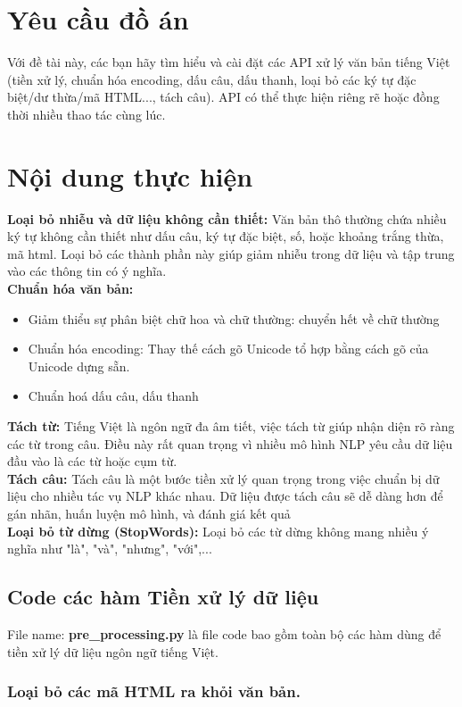
\section{Yêu cầu đồ án}
Với đề tài này, các bạn hãy tìm hiểu và cài đặt các API xử lý văn bản tiếng Việt (tiền xử lý, chuẩn hóa encoding, dấu câu, dấu thanh, loại bỏ các ký tự đặc biệt/dư thừa/mã HTML..., tách câu). API có thể thực hiện riêng rẽ hoặc đồng thời nhiều thao tác cùng lúc.

\section{Nội dung thực hiện}
{\bf Loại bỏ nhiễu và dữ liệu không cần thiết:} Văn bản thô thường chứa nhiều ký tự không cần thiết như dấu câu, ký tự đặc biệt, số, hoặc khoảng trắng thừa, mã html. Loại bỏ các thành phần này giúp giảm nhiễu trong dữ liệu và tập trung vào các thông tin có ý nghĩa.\\
{\bf Chuẩn hóa văn bản:} 
\begin{itemize}
    \item Giảm thiểu sự phân biệt chữ hoa và chữ thường: chuyển hết về chữ thường
    \item Chuẩn hóa encoding: Thay thế cách gõ Unicode tổ hợp bằng cách gõ của Unicode dựng sẵn.
    \item Chuẩn hoá dấu câu, dấu thanh
\end{itemize}
{\bf Tách từ:} Tiếng Việt là ngôn ngữ đa âm tiết, việc tách từ giúp nhận diện rõ ràng các từ trong câu. Điều này rất quan trọng vì nhiều mô hình NLP yêu cầu dữ liệu đầu vào là các từ hoặc cụm từ. \\
{\bf Tách câu:} Tách câu là một bước tiền xử lý quan trọng trong việc chuẩn bị dữ liệu cho nhiều tác vụ NLP khác nhau. Dữ liệu được tách câu sẽ dễ dàng hơn để gán nhãn, huấn luyện mô hình, và đánh giá kết quả\\
{\bf Loại bỏ từ dừng (StopWords):} Loại bỏ các từ dừng không mang nhiều ý nghĩa như "là", "và", "nhưng", "với",...

\subsection{Code các hàm Tiền xử lý dữ liệu}
File name: \textbf{ pre\_processing.py} là file code bao gồm toàn bộ các hàm dùng để tiền xử lý dữ liệu ngôn ngữ tiếng Việt.

\subsubsection{Loại bỏ các mã HTML ra khỏi văn bản.}


